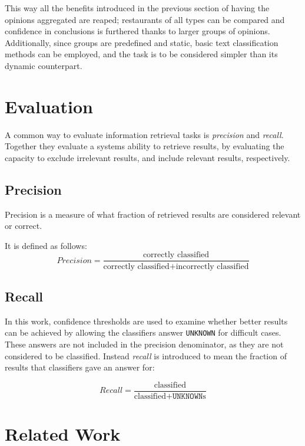 \documentclass[a4paper,11pt]{kth-mag}
\begin{document}
This way all the benefits introduced in the previous section of having the opinions
aggregated are reaped; restaurants of all types can be compared and confidence in conclusions
is furthered thanks to larger groups of opinions.
Additionally, since groups are predefined and static,
basic text classification methods can be employed, and the task is to be considered
simpler than its dynamic counterpart.


\section{Evaluation}  %
\label{sec:precision_recall}
A common way to evaluate information retrieval tasks is \emph{precision}
and \emph{recall}. Together they evaluate a systems ability to retrieve results,
by evaluating the capacity to exclude irrelevant results,
and include relevant results, respectively.

\subsection{Precision}
Precision is a measure of what fraction of retrieved results are considered relevant or correct.

It is defined as follows:
\begin{equation} \label{eq:precision}
Precision = \frac{\text {correctly classified}}{\text{correctly classified} + \text{incorrectly classified}}
\end{equation}

\subsection{Recall}
In this work, confidence thresholds are used to examine whether better results can be achieved by
allowing the classifiers answer \texttt{UNKNOWN} for difficult cases. These answers are not included in
the precision denominator, as they are not considered to be classified.
Instead \emph{recall} is introduced to mean the fraction of results that classifiers gave an answer for:

\begin{equation} \label{eq:recall}
Recall = \frac{\text {classified}}{\text{classified} + \texttt{UNKNOWN}\text{s}}
\end{equation}



\section{Related Work}
\end{document}
